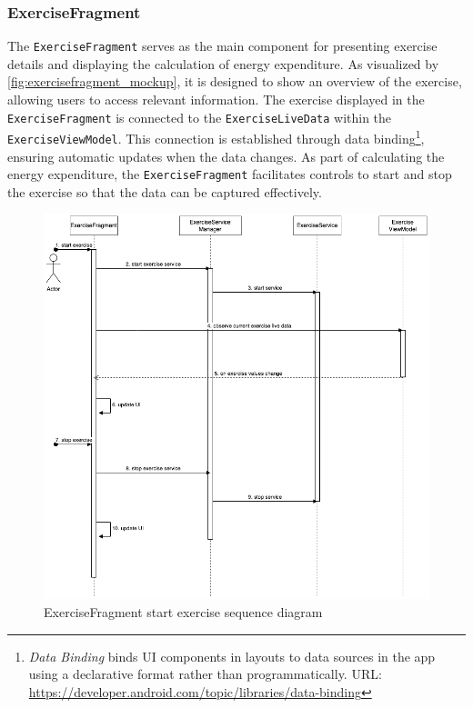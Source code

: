 \subsubsection{ExerciseFragment}
The \texttt{ExerciseFragment} serves as the main component for presenting exercise details and displaying the calculation of energy expenditure. 
As visualized by \autoref{fig:exercisefragment_mockup}, it is designed to show an overview of the exercise, allowing users to access relevant information.
The exercise displayed in the \texttt{ExerciseFragment} is connected to the \texttt{ExerciseLiveData} within the \texttt{ExerciseViewModel}. This connection is established through data binding\footnote{\emph{Data Binding} binds UI components in layouts to data sources in the app using a declarative format rather than programmatically. URL: \url{https://developer.android.com/topic/libraries/data-binding}}, ensuring automatic updates when the data changes. 
As part of calculating the energy expenditure, the \texttt{ExerciseFragment} facilitates controls to start and stop the exercise so that the data can be captured effectively.
\newline
\begin{figure}[H]
    \centering
    \includegraphics[width=1\textwidth]{diagrams/start-ex-frag.drawio.png}
    \caption{ExerciseFragment start exercise sequence diagram}
    \label{fig:exercisefragment_start_diagram}
\end{figure}
